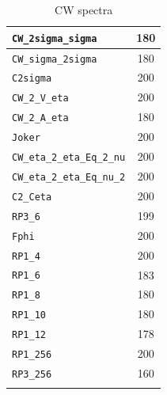 \begin{table}
\begin{tabular}{|l|c|}
\texttt{CW\_2sigma\_sigma} & 180\\\hline
\texttt{CW\_sigma\_2sigma} & 180\\\hline
\texttt{C2sigma} & 200\\\hline
\texttt{CW\_2\_V\_eta} & 200\\\hline
\texttt{CW\_2\_A\_eta} & 180\\\hline
\texttt{Joker} & 200\\\hline
\texttt{CW\_eta\_2\_eta\_Eq\_2\_nu} & 200\\\hline
\texttt{CW\_eta\_2\_eta\_Eq\_nu\_2} & 200\\\hline
\texttt{C2\_Ceta} & 200\\\hline
\texttt{RP3\_6} & 199\\\hline
\texttt{Fphi} & 200\\\hline
\texttt{RP1\_4} & 200\\\hline
\texttt{RP1\_6} & 183\\\hline
\texttt{RP1\_8} & 180\\\hline
\texttt{RP1\_10} & 180\\\hline
\texttt{RP1\_12} & 178\\\hline
\texttt{RP1\_256} & 200\\\hline
\texttt{RP3\_256} & 160\\\hline
 & \\\hline
\end{tabular}
\caption{CW spectra}\label{tb:CW1}
\end{table}